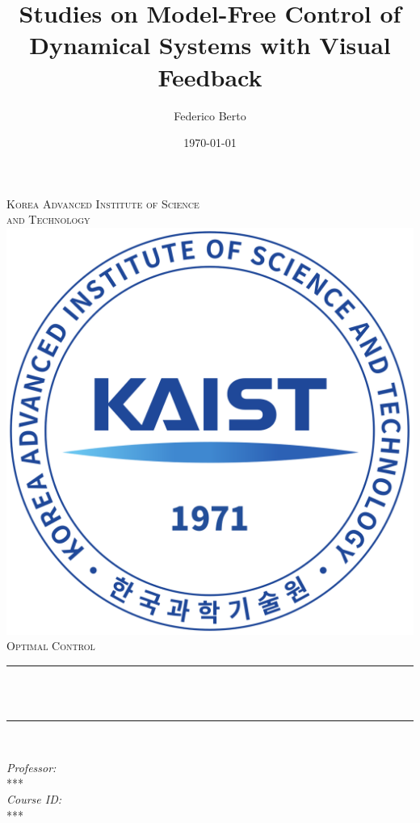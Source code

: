 \documentclass[11pt]{article}
\title{Studies on Model-Free Control of Dynamical Systems with Visual Feedback}
\author{Federico Berto}
\date{\today}
\makeatletter
\newcommand{\professor}{***}
\newcommand{\coursename}{Optimal Control}
\newcommand{\courseid}{***}
\let\thetitle\@title
\makeatother
\begin{document}

\begin{titlepage}
	\centering
    \textsc{\LARGE  Korea Advanced Institute of Science \\ \smallskip and Technology}\\[1 cm]	%
    \includegraphics[scale = 0.18]{kaist_round_logo.png}\\[1.5 cm]	%
	\textsc{\Large \coursename}\\[0.5 cm]				%
	\rule{\linewidth}{0.2 mm} \\[0.4 cm]
	{ \huge \bfseries {\thetitle}}\\
	\rule{\linewidth}{0.2 mm} \\[1.5 cm]
	

	\begin{minipage}{0.5\textwidth}
		\begin{flushleft} \large
			\emph{Professor:}\\
		    \professor \\ [0.5cm]
            \emph{Course ID:}\\
            \courseid
			\end{flushleft}
			\end{minipage}~
			\begin{minipage}{0.4\textwidth}
            

\end{minipage}
\end{titlepage}
\end{document}
